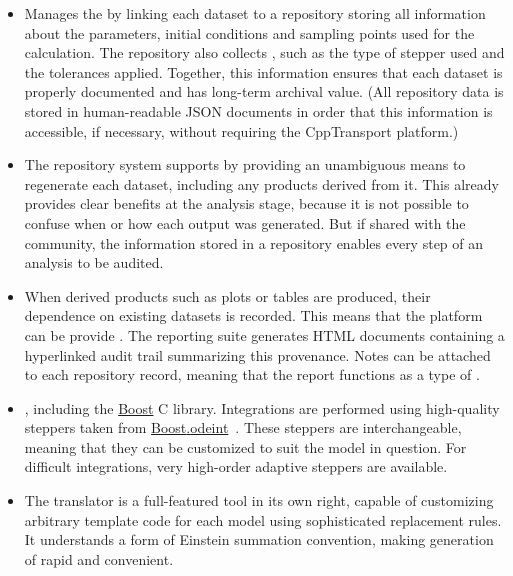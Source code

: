 \documentclass[11pt,a4paper]{article}
\newcommand{\packagefont}{\sffamily}
\newcommand{\CppTransport}{{\packagefont CppTransport}}
\newcommand{\Boost}{{\packagefont Boost}}
\newcommand{\odeint}{{\packagefont odeint}}
\newcommand{\semibold}[1]{{\fontseries{b}\selectfont{#1}}}
\newcommand\CC{C\nolinebreak\hspace{-.05em}\raisebox{.4ex}{\relsize{-3}{\textbf{+}}}\nolinebreak\hspace{-.10em}\raisebox{.4ex}{\relsize{-3}{\textbf{+}}}}
\begin{document}
\begin{itemize}
    \item Manages the \semibold{data lifecycle} by
    linking each dataset
    to a repository
    storing all information
    about the parameters, initial conditions and sampling points
    used for the calculation.
    The repository also collects \semibold{metadata about the integration},
    such as the type of stepper used and the tolerances applied.
    Together, this information
    ensures that each dataset is properly documented and
    has long-term archival value.
    (All repository data is stored in human-readable
    JSON documents in order that this information is accessible, if necessary,
    without requiring the {\CppTransport} platform.)
    
    \item The repository system
    supports \semibold{reproducible research} by providing
    an unambiguous means to regenerate
    each dataset, including any products derived
    from it.
    This already provides clear benefits at the analysis stage, because it
    is not possible to confuse when or how each
    output was generated.
    But if shared with the community, the information stored
    in a repository
    enables every step of an analysis to
    be audited.
        
    \item When derived products such as plots or tables are produced,
    their dependence on existing datasets is recorded.
    This means that the platform can be provide \semibold{a detailed
    provenance for any data product tracked by the repository}.
    The reporting suite generates
    HTML documents containing a hyperlinked
    audit trail summarizing this provenance.
    Notes can be attached to each repository record, meaning that
    the report functions as a type of \semibold{electronic
    laboratory notebook}.
    
    \item \semibold{Leverages standard libraries},
    including the \href{http://www.boost.org}{\Boost} {\CC} library.
    Integrations are performed using high-quality
    steppers taken from
    \href{http://www.boost.org/doc/libs/release/libs/numeric/odeint}{{\Boost}.{\odeint}}~\cite{2011AIPC.1389.1586A}.
    These steppers are interchangeable, meaning that they can be customized
    to suit the model in question.
    For difficult integrations, very high-order adaptive steppers
    are available.
    
    \item The translator is a full-featured tool in its own right,
    capable of customizing arbitrary template code
    for each model using sophisticated replacement rules.
    It understands a form of Einstein summation convention,
    making generation of \semibold{specialized template code}
    rapid and convenient.
\end{itemize}
\end{document}

